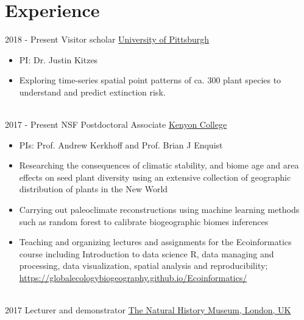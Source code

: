 \documentclass[letterpaper]{twentysecondcv} %
\begin{document}
\makeprofile %


\section{Experience}

\begin{twenty} %
\twentyitem
    	{2018 -}
		{Present}
        {Visitor scholar}
        {\href{https://www.biology.pitt.edu/}{University of Pittsburgh}}
        {}
        {\begin{itemize}
        \item PI: Dr. Justin Kitzes
        \item Exploring time-series spatial point patterns of ca. 300 plant species to understand and predict extinction risk. 
        \end{itemize}}
        \\
	\twentyitem
    	{2017 -}
		{Present}
        {NSF Postdoctoral Associate}
        {\href{https://www.kenyon.edu}{Kenyon College}}
        {}
        {
        {\begin{itemize}
        \item PIs: Prof. Andrew Kerkhoff and Prof. Brian J Enquist
        \item Researching the consequences of climatic stability, and biome age and area effects on seed plant diversity using an extensive collection of geographic distribution of plants in the New World
        \item Carrying out paleoclimate reconstructions using machine learning methods such as random forest to calibrate biogeographic biomes inferences
       	\item Teaching and organizing lectures and assignments for the Ecoinformatics course including Introduction to data science R, data managing and processing, data visualization, spatial analysis and reproducibility;  \url{https://globalecologybiogeography.github.io/Ecoinformatics/}
    \end{itemize}}
        }
    \\   
     \twentyitem
   		{2017}
		{}
        {Lecturer and demonstrator}
        {\href{http://www.nhm.ac.uk/}{The Natural History Museum, London, UK}}
        {}
        {
        {\begin{itemize}

\end{itemize}}}
\end{twenty}
\end{document}
